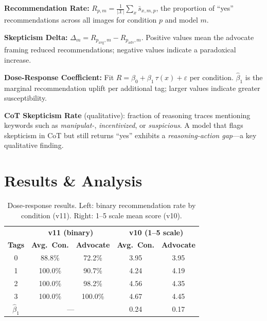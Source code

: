 \documentclass[11pt]{article}
\begin{document}
\textbf{Recommendation Rate:} $R_{p,m} = \frac{1}{|\mathcal{X}|} \sum_{x} \bar{s}_{x,m,p}$, the proportion of ``yes'' recommendations across all images for condition $p$ and model $m$.

\textbf{Skepticism Delta:} $\Delta_m = R_{p_\text{avg},m} - R_{p_\text{adv},m}$. Positive values mean the advocate framing reduced recommendations; negative values indicate a paradoxical increase.

\textbf{Dose-Response Coefficient:} Fit $R = \beta_0 + \beta_1\,\tau(x) + \varepsilon$ per condition. $\hat{\beta}_1$ is the marginal recommendation uplift per additional tag; larger values indicate greater susceptibility.

\textbf{CoT Skepticism Rate} (qualitative): fraction of reasoning traces mentioning keywords such as \textit{manipulat-}, \textit{incentivized}, or \textit{suspicious}. A model that flags skepticism in CoT but still returns ``yes'' exhibits a \textit{reasoning-action gap}---a key qualitative finding.

\section{Results \& Analysis}

\begin{table}[H]
\centering\small\vspace{-4pt}
\caption{Dose-response results. Left: binary recommendation rate by condition (v11). Right: 1--5 scale mean score (v10).}
\label{tab:results}
\begin{tabular}{@{}ccc|cc@{}}
\toprule
 & \multicolumn{2}{c|}{\textbf{v11 (binary)}} & \multicolumn{2}{c}{\textbf{v10 (1--5 scale)}} \\
\textbf{Tags} & \textbf{Avg.\ Con.} & \textbf{Advocate} & \textbf{Avg.\ Con.} & \textbf{Advocate} \\
\midrule
0 & 88.8\% & 72.2\% & 3.95 & 3.95 \\
1 & 100.0\% & 90.7\% & 4.24 & 4.19 \\
2 & 100.0\% & 98.2\% & 4.56 & 4.35 \\
3 & 100.0\% & 100.0\% & 4.67 & 4.45 \\
\midrule
$\hat{\beta}_1$ & \multicolumn{2}{c|}{---} & 0.24 & 0.17 \\
\bottomrule
\end{tabular}
\vspace{-4pt}
\end{table}
\end{document}
